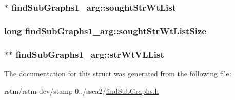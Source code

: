 \hypertarget{structfindSubGraphs1__arg_a3ab80bbe299f2ffc827cf3d3f8c38ecf}{
\subsubsection[{sought\-Str\-Wt\-List}]{$\ast$ find\-Sub\-Graphs1\-\_\-arg\-::sought\-Str\-Wt\-List}}\label{structfindSubGraphs1__arg_a3ab80bbe299f2ffc827cf3d3f8c38ecf}
\hypertarget{structfindSubGraphs1__arg_a82ebeb72bc301011829c3ba2da39f096}{
\subsubsection[{sought\-Str\-Wt\-List\-Size}]{\setlength{\rightskip}{0pt plus 5cm}long find\-Sub\-Graphs1\-\_\-arg\-::sought\-Str\-Wt\-List\-Size}}\label{structfindSubGraphs1__arg_a82ebeb72bc301011829c3ba2da39f096}
\hypertarget{structfindSubGraphs1__arg_a19475369818341a3a0045a22fae04abd}{
\subsubsection[{str\-Wt\-V\-L\-List}]{$\ast$$\ast$ find\-Sub\-Graphs1\-\_\-arg\-::str\-Wt\-V\-L\-List}}\label{structfindSubGraphs1__arg_a19475369818341a3a0045a22fae04abd}


The documentation for this struct was generated from the following file\-:\begin{DoxyCompactItemize}
\item 
rstm/rstm-\/dev/stamp-\/0../ssca2/\hyperlink{findSubGraphs_8h}{find\-Sub\-Graphs.\-h}\end{DoxyCompactItemize}
